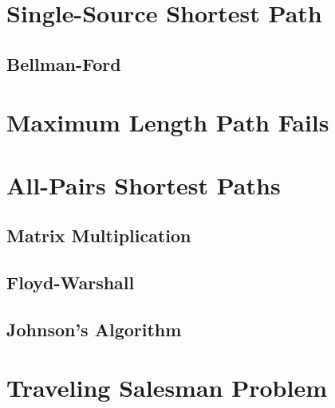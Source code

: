 \section{Single-Source Shortest Path}

\subsection{Bellman-Ford}

\section{Maximum Length Path Fails}

\section{All-Pairs Shortest Paths}

\subsection{Matrix Multiplication}

\subsection{Floyd-Warshall}

\subsection{Johnson's Algorithm}

\section{Traveling Salesman Problem}